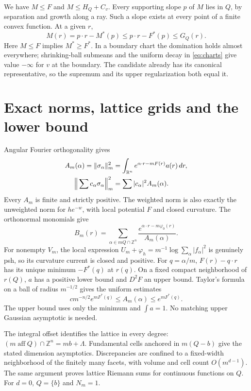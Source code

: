 \documentclass[11pt]{article}
\newcommand{\R}{\mathbb R}
\newcommand{\Z}{\mathbb Z}
\begin{document}
We have $M\leq F$ and $M\leq H_Q+C_v$. Every supporting slope $p$
of $M$ lies in $Q$, by separation and growth along a ray. Such a slope
exists at every point of a finite convex function. At a given $r$,
\[
 M(r)=p\cdot r-M^*(p)\leq p\cdot r-F^*(p)\leq G_Q(r).
\]
Here $M\leq F$ implies $M^*\geq F^*$. In a boundary chart the
domination holds almost everywhere; shrinking-ball submeans and the
uniform decay in \eqref{eq:charts} give value $-\infty$ for $v$ at
the boundary. The candidate already has its canonical representative,
so the supremum and its upper regularization both equal it.

\section{Exact norms, lattice grids and the lower bound}
Angular Fourier orthogonality gives
\begin{align}
 A_m(\alpha)=\|\sigma_\alpha\|_m^2
     &=\int_{\R^n}e^{\alpha\cdot r-mF(r)}a(r)\,dr,\label{eq:norm}\\
 \Big\|\sum c_\alpha\sigma_\alpha\Big\|_m^2
     &=\sum|c_\alpha|^2A_m(\alpha).\notag
\end{align}
Every $A_m$ is finite and strictly positive. The weighted norm is also
exactly the unweighted norm for $he^{-w}$, with local potential $F$
and closed curvature. The orthonormal monomials give
\begin{equation}\label{eq:kernel}
 B_m(r)=\sum_{\alpha\in mQ\cap\Z^n}
          \frac{e^{\alpha\cdot r-m\varphi_0(r)}}{A_m(\alpha)}.
\end{equation}
For nonempty $V_m$, the local expression
$U_m+\varphi_h=m^{-1}\log\sum_\alpha|f_\alpha|^2$
is genuinely psh, so its curvature current is closed and positive.
For $q=\alpha/m$, $F(r)-q\cdot r$ has its unique minimum $-F^*(q)$
at $r(q)$. On a fixed compact neighborhood of $r(Q)$, $a$ has a
positive lower bound and $D^2F$ an upper bound. Taylor's formula
on a ball of radius $m^{-1/2}$ gives the uniform estimates
\begin{equation}\label{eq:laplace}
 c m^{-n/2}e^{mF^*(q)}\leq A_m(\alpha)\leq e^{mF^*(q)}.
\end{equation}
The upper bound uses only the minimum and $\int a=1$. No matching
upper Gaussian asymptotic is needed.

The integral offset identifies the lattice in every degree:
$(m\operatorname{aff}Q)\cap\Z^n=mb+\Lambda$. Fundamental cells
anchored in $m(Q-b)$ give the stated dimension asymptotics.
Discrepancies are confined to a fixed-width neighborhood of the finitely
many facets, with volume and cell count $O(m^{d-1})$. The same
argument proves lattice Riemann sums for continuous functions on $Q$.
For $d=0$, $Q=\{b\}$ and $N_m=1$.
\end{document}

